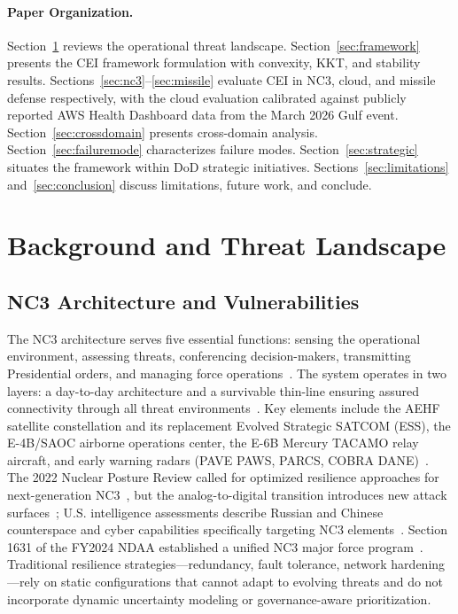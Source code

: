 \documentclass[runningheads]{llncs}
\begin{document}
\paragraph{Paper Organization.}
Section~\ref{sec:background} reviews the operational threat landscape. Section~\ref{sec:framework} presents the CEI framework formulation with convexity, KKT, and stability results. Sections~\ref{sec:nc3}--\ref{sec:missile} evaluate CEI in NC3, cloud, and missile defense respectively, with the cloud evaluation calibrated against publicly reported AWS Health Dashboard data from the March 2026 Gulf event. Section~\ref{sec:crossdomain} presents cross-domain analysis. Section~\ref{sec:failuremode} characterizes failure modes. Section~\ref{sec:strategic} situates the framework within DoD strategic initiatives. Sections~\ref{sec:limitations} and~\ref{sec:conclusion} discuss limitations, future work, and conclude.

\section{Background and Threat Landscape}
\label{sec:background}

\subsection{NC3 Architecture and Vulnerabilities}

The NC3 architecture serves five essential functions: sensing the operational environment, assessing threats, conferencing decision-makers, transmitting Presidential orders, and managing force operations~\cite{crs_nc3}. The system operates in two layers: a day-to-day architecture and a survivable thin-line ensuring assured connectivity through all threat environments~\cite{nuclear_handbook}. Key elements include the AEHF satellite constellation and its replacement Evolved Strategic SATCOM (ESS), the E-4B/SAOC airborne operations center, the E-6B Mercury TACAMO relay aircraft, and early warning radars (PAVE PAWS, PARCS, COBRA DANE)~\cite{crs_nc3,atlantic_council}. The 2022 Nuclear Posture Review called for optimized resilience approaches for next-generation NC3~\cite{npr_2022}, but the analog-to-digital transition introduces new attack surfaces~\cite{wirtz}; U.S. intelligence assessments describe Russian and Chinese counterspace and cyber capabilities specifically targeting NC3 elements~\cite{atlantic_council}. Section 1631 of the FY2024 NDAA established a unified NC3 major force program~\cite{ndaa2024}. Traditional resilience strategies---redundancy, fault tolerance, network hardening---rely on static configurations that cannot adapt to evolving threats and do not incorporate dynamic uncertainty modeling or governance-aware prioritization.
\end{document}
